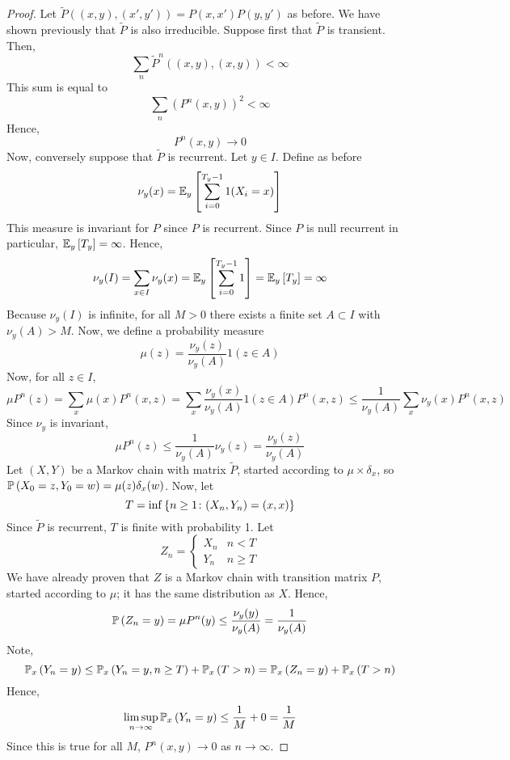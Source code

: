 \begin{proof}
	Let \( \widetilde P((x,y),(x',y')) = P(x,x')P(y,y') \) as before.
	We have shown previously that \( \widetilde P \) is also irreducible.
	Suppose first that \( \widetilde P \) is transient.
	Then,
	\[
		\sum_n \widetilde P^n((x,y),(x,y)) < \infty
	\]
	This sum is equal to
	\[
		\sum_n (P^n(x,y))^2 < \infty
	\]
	Hence,
	\[
		P^n(x,y) \to 0
	\]
	Now, conversely suppose that \( \widetilde P \) is recurrent.
	Let \( y \in I \).
	Define as before
	\[
		\nu_y(x) = \mathbb{E}_{y}\left[{\sum_{i=0}^{T_y - 1} 1(X_i = x)}\right]
	\]
	This measure is invariant for \( P \) since \( P \) is recurrent.
	Since \( P \) is null recurrent in particular, \( \mathbb{E}_{y}\left[{T_y}\right] = \infty \).
	Hence,
	\[
		\nu_y(I) = \sum_{x \in I} \nu_y(x) = \mathbb{E}_{y}\left[{\sum_{i=0}^{T_y - 1} 1}\right] = \mathbb{E}_{y}\left[{T_y}\right] = \infty
	\]
	Because \( \nu_y(I) \) is infinite, for all \( M > 0 \) there exists a finite set \( A \subset I \) with \( \nu_y(A) > M \).
	Now, we define a probability measure
	\[
		\mu(z) = \frac{\nu_y(z)}{\nu_y(A)} 1(z \in A)
	\]
	Now, for all \( z \in I \),
	\[
		\mu P^n(z) = \sum_x \mu(x) P^n(x,z) = \sum_x \frac{\nu_y(x)}{\nu_y(A)} 1(z \in A) P^n(x,z) \leq \frac{1}{\nu_y(A)} \sum_x \nu_y(x) P^n(x,z)
	\]
	Since \( \nu_y \) is invariant,
	\[
		\mu P^n(z) \leq \frac{1}{\nu_y(A)} \nu_y(z) = \frac{\nu_y(z)}{\nu_y(A)}
	\]
	Let \( (X, Y) \) be a Markov chain with matrix \( \widetilde P \), started according to \( \mu \times \delta_x \), so \( \mathbb{P}\left({X_0 = z, Y_0 = w}\right) = \mu(z) \delta_x(w) \).
	Now, let
	\[
		T = \inf\qty{n \geq 1 \colon (X_n, Y_n) = (x,x)}
	\]
	Since \( \widetilde P \) is recurrent, \( T \) is finite with probability 1.
	Let
	\[
		Z_n = \begin{cases}
			X_n & n < T    \\
			Y_n & n \geq T
		\end{cases}
	\]
	We have already proven that \( Z \) is a Markov chain with transition matrix \( P \), started according to \( \mu \); it has the same distribution as \( X \).
	Hence,
	\[
		\mathbb{P}\left({Z_n = y}\right) = \mu P^n(y) \leq \frac{\nu_y(y)}{\nu_y(A)} = \frac{1}{\nu_y(A)}
	\]
	Note,
	\[
		\mathbb{P}_{x}\left({Y_n = y}\right) \leq \mathbb{P}_{x}\left({Y_n = y, n \geq T}\right) + \mathbb{P}_{x}\left({T > n}\right) = \mathbb{P}_{x}\left({Z_n = y}\right) + \mathbb{P}_{x}\left({T > n}\right)
	\]
	Hence,
	\[
		\limsup_{n \to \infty} \mathbb{P}_{x}\left({Y_n = y}\right) \leq \frac{1}{M} + 0 = \frac{1}{M}
	\]
	Since this is true for all \( M \), \( P^n(x,y) \to 0 \) as \( n \to \infty \).
\end{proof}
